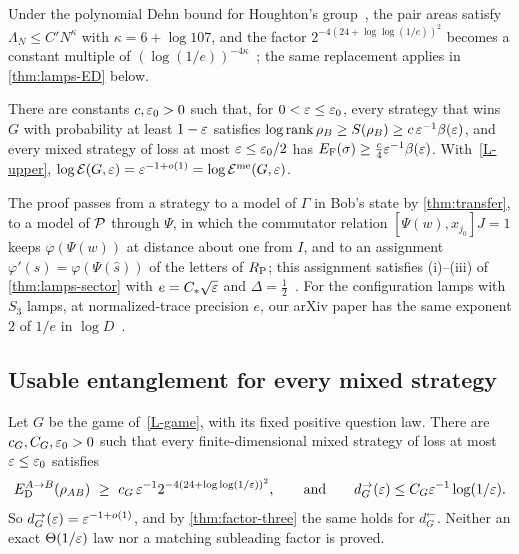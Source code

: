 \begin{remark}\label{rem:lamps-poly}
Under the polynomial Dehn bound for Houghton's group~\cite[Theorems~3.2 and~3.3]{DM-H3}, the pair areas satisfy
$\Lambda_N\le C'N^\kappa$ with $\kappa=6+\log107$, and the factor $2^{-4(24+\log\log(1/e))^2}$ becomes a constant multiple of
$(\log(1/e))^{-4\kappa}$~\cite[Remarks~7.10 and~8.3]{DM-game}; the same replacement applies in \cref{thm:lamps-ED} below.
\end{remark}

\begin{theorem}\label{thm:lamps-game}
There are constants $c,\varepsilon_0>0$ such that, for $0<\varepsilon\le\varepsilon_0$, every strategy that wins $G$ with probability at least $1-\varepsilon$
satisfies $\log\operatorname{rank}\rho_B\ge S(\rho_B)\ge c\,\varepsilon^{-1}\beta(\varepsilon)$, and every mixed strategy of loss at most $\varepsilon\le\varepsilon_0/2$ has
$E_{\mathrm F}(\sigma)\ge\frac c4\varepsilon^{-1}\beta(\varepsilon)$. With~\ref{L-upper}, $\log\mathcal E(G,\varepsilon)=\varepsilon^{-1+o(1)}=\log\mathcal E^{\mathrm{me}}(G,\varepsilon)$.
\end{theorem}

The proof passes from a strategy to a model of $\Gamma$ in Bob's state by \cref{thm:transfer}, to a model of $\mathcal P$ through
$\Psi$, in which the commutator relation $[\Psi(w),x_{j_0}]J=1$ keeps $\varphi(\Psi(w))$ at distance about one from $I$, and to an
assignment $\varphi'(s)=\varphi(\Psi(\hat s))$ of the letters of $R_{\mathrm P}$; this assignment satisfies (i)--(iii) of
\cref{thm:lamps-sector} with $e=C_*\sqrt{\varepsilon}$ and $\Delta=\frac12$~\cite[proof of Theorem~10.5(b), Steps~1--4]{DM-game}. For the
configuration lamps with $S_3$ lamps, at normalized-trace precision $e$, our arXiv paper has the same exponent $2$ of $1/e$ in
$\log D$~\cite[Theorem~A(b)]{DM-lamps}.

\subsection{Usable entanglement for every mixed strategy}\label{sec:lamps-ED}

\begin{theorem}\label{thm:lamps-ED}
Let $G$ be the game of~\ref{L-game}, with its fixed positive question law. There are $c_G,C_G,\varepsilon_0>0$ such that every
finite-dimensional mixed strategy of loss at most $\varepsilon\le\varepsilon_0$ satisfies
\[
\ED^{A\to B}(\rho_{AB})\ \ge\ c_G\,\eps^{-1}2^{-4(24+\log\log(1/\eps))^2},\qquad\text{and}\qquad d_G^\to(\eps)\le C_G\eps^{-1}\log(1/\eps).
\]
So $d_G^\to(\varepsilon)=\varepsilon^{-1+o(1)}$, and by \cref{thm:factor-three} the same holds for $d_G^\leftarrow$. Neither an exact
$\Theta(1/\varepsilon)$ law nor a matching subleading factor is proved.
\end{theorem}

